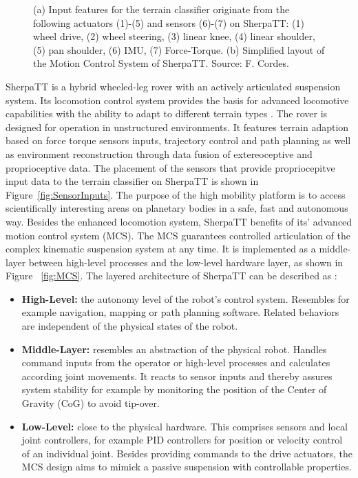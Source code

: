 \begin{figure}[!htbp]
{       }
   \caption{\label{fig:Loco}(a) Input features for the terrain classifier originate from the following actuators (1)-(5) and sensors (6)-(7) on SherpaTT: (1) wheel drive, (2) wheel steering, (3) linear knee, (4) linear shoulder, (5) pan shoulder, (6) IMU, (7) Force-Torque. (b) Simplified layout of the Motion Control System of SherpaTT. Source: F. Cordes.}
\end{figure}

SherpaTT is a hybrid wheeled-leg rover with an actively articulated suspension system. Its locomotion control system provides the basis for advanced locomotive capabilities with the ability to adapt to different terrain types \cite{cordes2018}. The rover is designed for operation in unstructured environments. It features terrain adaption based on force torque sensors inputs, trajectory control and path planning as well as environment reconstruction through data fusion of extereoceptive and proprioceptive data. The placement of the sensors that provide propriocepitve input data to the terrain classifier on SherpaTT is shown in Figure~\ref{fig:SensorInputs}. The purpose of the high mobility platform is to access scientifically interesting areas on planetary bodies in a safe, fast and autonomous way. Besides the enhanced locomotion system, SherpaTT benefits of its’ advanced motion control system (MCS). The MCS guarantees controlled articulation of the complex kinematic suspension system at any time. It is implemented as a middle-layer between high-level processes and the low-level hardware layer, as shown in Figure ~\ref{fig:MCS}. The layered architecture of SherpaTT can be described as \cite{cordes2018}:

\begin{itemize}
    \item \textbf{High-Level:} the autonomy level of the robot’s control system. Resembles for example navigation, mapping or path planning software. Related behaviors are independent of the physical states of the robot.
    \item \textbf{Middle-Layer:} resembles an abstraction of the physical robot. Handles command inputs from the operator or high-level processes and calculates according joint movements. It reacts to sensor inputs and thereby assures system stability for example by monitoring the position of the Center of Gravity (CoG) to avoid tip-over.
    \item \textbf{Low-Level:} close to the physical hardware. This comprises sensors and local joint controllers, for example PID controllers for position or velocity control of an individual joint. Besides providing commands to the drive actuators, the MCS design aims to mimick a passive suspension with controllable properties.
\end{itemize}

